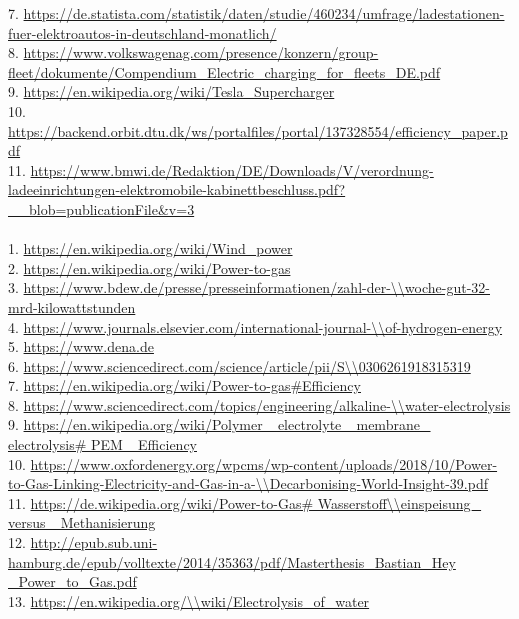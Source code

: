 \begin{parcolumns}[colwidths={1=2.5 cm, 2=12 cm}]{2}
{7. \url{https://de.statista.com/statistik/daten/studie/460234/umfrage/ladestationen-fuer-elektroautos-in-deutschland-monatlich/} \\
8. \url{https://www.volkswagenag.com/presence/konzern/group-fleet/dokumente/Compendium_Electric_charging_for_fleets_DE.pdf} \\
9. \url{https://en.wikipedia.org/wiki/Tesla_Supercharger} \\
10. \url{https://backend.orbit.dtu.dk/ws/portalfiles/portal/137328554/efficiency_paper.pdf} \\
11. \url{https://www.bmwi.de/Redaktion/DE/Downloads/V/verordnung-ladeeinrichtungen-elektromobile-kabinettbeschluss.pdf?__blob=publicationFile&v=3} \\
\\
1. \url{https://en.wikipedia.org/wiki/Wind_power}\\
2. \url{https://en.wikipedia.org/wiki/Power-to-gas}\\
3. \url{https://www.bdew.de/presse/presseinformationen/zahl-der-\\woche-gut-32-mrd-kilowattstunden} \\
4. \url{https://www.journals.elsevier.com/international-journal-\\of-hydrogen-energy}\\
5. \url{https://www.dena.de}\\
6. \url{https://www.sciencedirect.com/science/article/pii/S\\0306261918315319}\\
7. \url{https://en.wikipedia.org/wiki/Power-to-gas\#Efficiency}\\ 
8. \url{https://www.sciencedirect.com/topics/engineering/alkaline-\\water-electrolysis}\\
9. \url{https://en.wikipedia.org/wiki/Polymer\_ electrolyte\_ membrane\_ electrolysis\# PEM\_ Efficiency}\\
10. \url{https://www.oxfordenergy.org/wpcms/wp-content/uploads/2018/10/Power-to-Gas-Linking-Electricity-and-Gas-in-a-\\Decarbonising-World-Insight-39.pdf}\\
11. \url{https://de.wikipedia.org/wiki/Power-to-Gas\# Wasserstoff\\einspeisung\_ versus\_ Methanisierung}\\
12. \url{http://epub.sub.uni-hamburg.de/epub/volltexte/2014/35363/pdf/Masterthesis\_Bastian\_Hey
\_Power\_to\_Gas.pdf}\\
13. \url{https://en.wikipedia.org/\\wiki/Electrolysis\_of\_water 
}}
\end{parcolumns}
